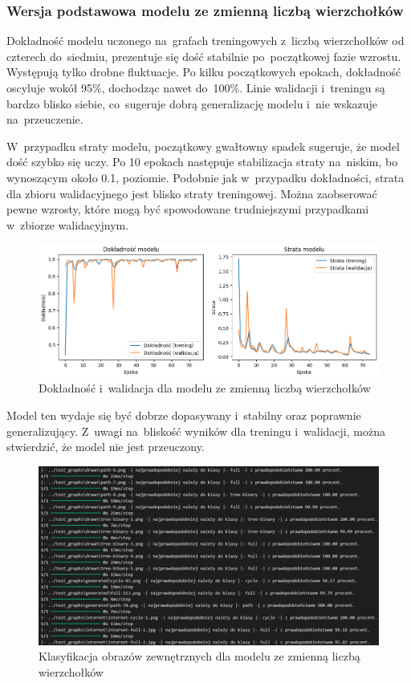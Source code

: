 \subsubsection{Wersja podstawowa modelu ze zmienną liczbą wierzchołków}

Dokładność modelu uczonego na~grafach treningowych z~liczbą wierzchołków od czterech do~siedmiu,
prezentuje się dość stabilnie po~początkowej fazie wzrostu. Występują tylko drobne fluktuacje.
Po kilku początkowych epokach, dokładność oscyluje wokół 95\%, dochodząc nawet do~100\%.
Linie walidacji i~treningu są bardzo blisko siebie, co~sugeruje dobrą generalizację modelu
i~nie wskazuje na~przeuczenie.

W~przypadku straty modelu, początkowy gwałtowny spadek sugeruje, że model dość szybko się uczy.
Po 10 epokach następuje stabilizacja straty na~niskim, bo wynoszącym około 0.1, poziomie.
Podobnie jak w~przypadku dokładności, strata dla zbioru walidacyjnego jest blisko straty treningowej.
Można zaobserować pewne wzrosty, które mogą być spowodowane trudniejszymi przypadkami w~zbiorze walidacyjnym.

\begin{figure}[ht]
	\centering
	\includegraphics[width=15.5cm]{resources/tests/images/v3/multiple_edges_img.png}
	\caption{Dokładność i~walidacja dla modelu ze zmienną liczbą wierzchołków}
	\label{Fig:tests-var-0a}
\end{figure}
\FloatBarrier

Model ten wydaje się być dobrze dopasywany i~stabilny oraz poprawnie generalizujący.
Z~uwagi na~bliskość wyników dla treningu i~walidacji, można stwierdzić, że model nie jest przeuczony.

\begin{figure}[ht]
	\centering
	\includegraphics[width=15.5cm]{resources/tests/images/v3/multiple_edges_txt.png}
	\caption{Klasyfikacja obrazów zewnętrznych dla modelu ze zmienną liczbą wierzchołków}
	\label{Fig:tests-var-0b}
\end{figure}
\FloatBarrier

